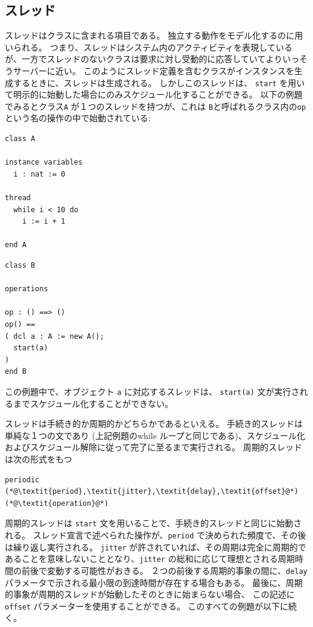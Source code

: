 \documentclass[\pformat,12pt]{jreport}
\begin{document}
\subsection{スレッド}

スレッドはクラスに含まれる項目である。
独立する動作をモデル化するのに用いられる。
つまり、スレッドはシステム内のアクティビティを表現しているが、一方でスレッドのないクラスは要求に対し受動的に応答していてよりいっそうサーバーに近い。
このようにスレッド定義を含むクラスがインスタンスを生成するときに、スレッドは生成される。
しかしこのスレッドは、 \texttt{start} を用いて明示的に始動した場合にのみスケジュール化することができる。
以下の例題でみるとクラス\texttt{A} が１つのスレッドを持つが、これは \texttt{B}と呼ばれるクラス内の\texttt{op} という名の操作の中で始動されている:

\begin{multicols}{2}
\begin{lstlisting}
class A

instance variables
  i : nat := 0

thread
  while i < 10 do
    i := i + 1

end A
\end{lstlisting}
\begin{lstlisting}
class B

operations

op : () ==> ()
op() ==
( dcl a : A := new A();
  start(a)
)
end B
\end{lstlisting}
\end{multicols}

この例題中で、オブジェクト \texttt{a} に対応するスレッドは、 \texttt{start(a)} 文が実行されるまでスケジュール化することができない。

スレッドは手続き的か周期的かどちらかであるといえる。
手続き的スレッドは単純な１つの文であり (上記例題のwhile ループと同じである)、スケジュール化およびスケジュール解除に従って完了に至るまで実行される。
周期的スレッドは次の形式をもつ

\begin{lstlisting}
periodic (*@\textit{period},\textit{jitter},\textit{delay},\textit{offset}@*) (*@\textit{operation}@*)
\end{lstlisting}

周期的スレッドは \texttt{start} 文を用いることで、手続き的スレッドと同じに始動される。
スレッド宣言で述べられた操作が、\texttt{period} で決められた頻度で、その後は繰り返し実行される。
\texttt{jitter} が許されていれば、その周期は完全に周期的であることを意味しないこととなり、\texttt{jitter} の総和に応じて理想とされる周期時間の前後で変動する可能性がおきる。
２つの前後する周期的事象の間に、\texttt{delay} パラメータで示される最小限の到達時間が存在する場合もある。
最後に、周期的事象が周期的スレッドが始動したそのときに始まらない場合、 この記述に\texttt{offset} パラメーターを使用することができる。
このすべての例題が以下に続く。
\end{document}
